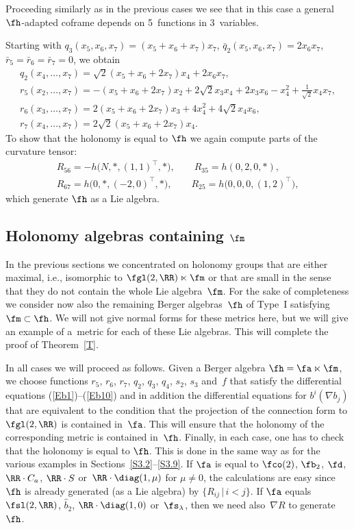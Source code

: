 \begin{Remark} Proceeding similarly as in the previous cases we see that in this case a general $\fh$-adapted coframe depends on 5~functions in 3~variables.
\end{Remark}

\begin{Example} Starting with $q_3(x_5,x_6,x_7)=(x_5+ x_6+x_7)x_7$, $\bar q_2(x_5,x_6,x_7)=2x_6x_7$, $\bar r_5=\bar r_6=\bar r_7=0$, we obtain
\begin{gather*}
q_2(x_4,\dots,x_7) = \sqrt2(x_5+x_6+2 x_7)x_4+2x_6 x_7 ,\\
r_5(x_2,\dots, x_7) = -(x_5+x_6+2 x_7)x_2+2 \sqrt2 x_3x_4+2 x_3x_6-x_4^2+ \tfrac1{\sqrt2} x_4x_7,\\
r_6(x_3,\dots,x_7) = 2(x_5+x_6+2x_7) x_3+4x_4^2+4\sqrt2 x_4 x_6,\\
r_7(x_4,\dots, x_7) = 2\sqrt 2(x_5+x_6+2x_7)x_4 .
\end{gather*}
To show that the holonomy is equal to $\fh$ we again compute parts of the curvature tensor:
\begin{gather*}
 R_{56}=-h\big(N,*,(1,1)^\top,*\big),\qquad R_{35}=h(0,2,0,*),\\
 R_{67}= h\big(0,*,(-2,0)^\top,*\big),\qquad R_{25}= h\big(0,0,0,(1,2)^\top\big),
 \end{gather*}
which generate $\fh$ as a Lie algebra.
\end{Example}

\subsection[Holonomy algebras containing $\fm$]{Holonomy algebras containing $\boldsymbol{\fm}$}
In the previous sections we concentrated on holonomy groups that are either maximal, i.e., isomorphic to $\fgl(2,\RR)\ltimes\fm$ or that are small in the sense that they do not contain the whole Lie algebra~$\fm$. For the sake of completeness we consider now also the remaining Berger algebras~$\fh$ of Type~I satisfying $\fm\subset \fh$. We will not give normal forms for these metrics here, but we will give an example of a~metric for each of these Lie algebras. This will complete the proof of Theorem~\ref{T}.

In all cases we will proceed as follows. Given a Berger algebra $\fh=\fa\ltimes\fm$, we choose functions $r_5$, $r_6$, $r_7$, $q_2$, $q_3$, $q_4$, $s_2$, $s_3$ and~$f$ that satisfy the differential equations (\ref{Eb1})--(\ref{Eb10}) and in addition the differential equations for $b^i(\nabla b_j)$ that are equivalent to the condition that the projection of the connection form to $\fgl(2,\RR)$ is contained in~$\fa$. This will ensure that the holonomy of the corresponding metric is contained in~$\fh$. Finally, in each case, one has to check that the holonomy is equal to $\fh$. This is done in the same way as for the various examples in Sections~\ref{S3.2}--\ref{S3.9}. If $\fa$ is equal to $\fco(2)$, $\fb_2$, $\fd$, $\RR\cdot C_a$, $\RR\cdot S$ or~$\RR\cdot \diag(1,\mu)$ for $\mu\not=0$, the calculations are easy since~$\fh$ is already generated (as a Lie algebra) by $\{R_{ij}\,|\, i<j\}$. If $\fa$ equals $\fsl(2,\RR)$, $\hat b_2$, $\RR\cdot\diag(1,0)$ or~$\fs_\lambda$, then we need also~$\nabla R$ to generate~$\fh$.

